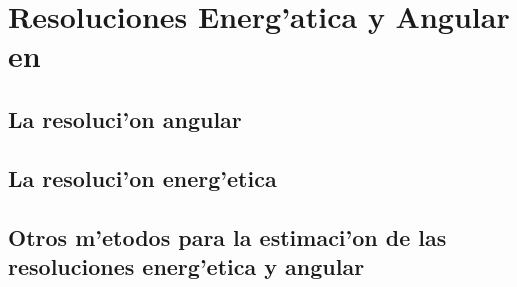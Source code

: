 

\chapter{Resoluciones Energ'atica y Angular en \MAGIC}
\label{chapter:resol}

\section{La resoluci'on angular}

\section{La resoluci'on energ'etica}

\section{Otros m'etodos para la estimaci'on de las resoluciones
  energ'etica y angular}

\endinput
%

